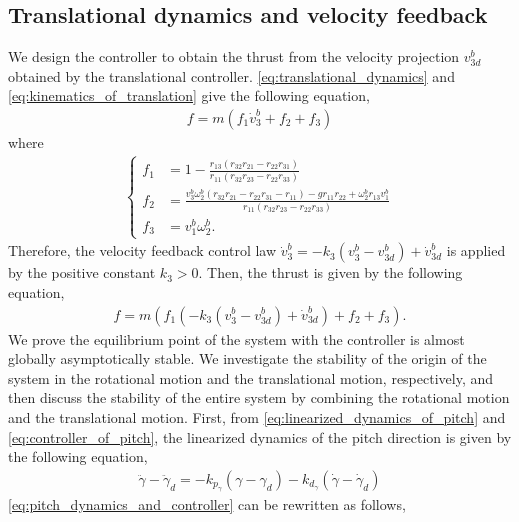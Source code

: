 \subsection{Translational dynamics and velocity feedback}
\label{subsec:translational_dynamics_and_velocity_feedback}
We design the controller to obtain the thrust from the  velocity projection $ v_{3d}^b $ obtained by the translational controller.
\eqref{eq:translational_dynamics} and \eqref{eq:kinematics_of_translation} give the following equation,
\begin{align*}
    f = m (f_1 \dot{v}_3^b + f_2 + f_3)
\end{align*}
where
\begin{align*}
    \begin{cases}
            f_1 &= 1 - \frac{r_{13} (r_{32} r_{21} - r_{22} r_{31})}{r_{11}(r_{32} r_{23} - r_{22} r_{33})}\\
            f_2 &= \frac{v_3^b \omega_2^b (r_{32} r_{21} - r_{22} r_{31}  - r_{11}) - g r_{11} r_{22} + \omega_2^b r_{13} v_1^b}{r_{11} (r_{32} r_{23} - r_{22} r_{33})}\\
            f_3 &= v_1^b \omega_2^b.
    \end{cases}
\end{align*}
Therefore, the velocity feedback control law $ \dot{v}_3^b = -k_3 (v_3^b - v_{3d}^b ) + \dot{v}_{3d}^b $ is applied by the positive constant $ k_3 > 0 $.
Then, the thrust is given by the following equation,
\begin{align*}
    f = m \left (f_1 \left ( -k_3 \left (v_3^b - v_{3d}^b \right ) + \dot{v}_{3d}^b \right ) + f_2 + f_3 \right ).
\end{align*}
We prove the equilibrium point of the system with the controller is almost globally asymptotically stable.
We investigate the stability of the origin of the system in the rotational motion and the translational motion, respectively, and then discuss the stability of the entire system by combining the rotational motion and the translational motion.
First, from \eqref{eq:linearized_dynamics_of_pitch} and \eqref{eq:controller_of_pitch}, the linearized dynamics of the pitch direction is given by the following equation,
\begin{align}
    \label{eq:pitch_dynamics_and_controller}
    \ddot{\gamma} - \ddot{\gamma}_d= - k_{p_{\gamma}} (\gamma - \gamma_d) - k_{d_{\gamma}} (\dot{\gamma} - \dot{\gamma}_d)
\end{align}
\eqref{eq:pitch_dynamics_and_controller} can be rewritten as follows,
